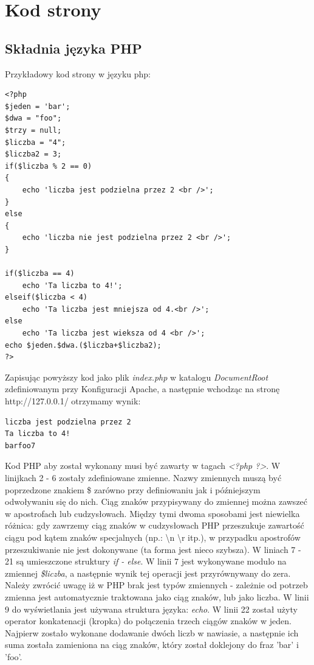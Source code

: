 \documentclass[a4paper,10pt]{article}
\begin{document}
\section{Kod strony}
\subsection{Składnia języka PHP}
Przykładowy kod strony w języku php: \\
\begin{verbatim}
<?php
$jeden = 'bar';
$dwa = "foo";
$trzy = null;
$liczba = "4";
$liczba2 = 3;
if($liczba % 2 == 0)
{
	echo 'liczba jest podzielna przez 2 <br />';
}
else
{
	echo 'liczba nie jest podzielna przez 2 <br />';
}

if($liczba == 4)
	echo 'Ta liczba to 4!';
elseif($liczba < 4)
	echo 'Ta liczba jest mniejsza od 4.<br />';
else
	echo 'Ta liczba jest wieksza od 4 <br />';
echo $jeden.$dwa.($liczba+$liczba2);
?>
\end{verbatim}
Zapisując powyższy kod jako plik \textit{index.php} w katalogu \textit{DocumentRoot} zdefiniowanym przy Konfiguracji Apache, a następnie wchodząc na stronę http://127.0.0.1/ otrzymamy wynik:
\begin{verbatim}
liczba jest podzielna przez 2
Ta liczba to 4!
barfoo7
\end{verbatim}
Kod PHP aby został wykonany musi być zawarty w tagach \textit{<?php ?>}.
W linijkach 2 - 6 zostały zdefiniowane zmienne. Nazwy zmiennych muszą być poprzedzone znakiem \$ zarówno przy definiowaniu jak i późniejszym odwoływaniu się do nich. Ciąg znaków przypisywany do zmiennej można zawszeć w apostrofach lub cudzysłowach. Między tymi dwoma sposobami jest niewielka różnica: gdy zawrzemy ciąg znaków w cudzysłowach PHP przeszukuje zawartość ciągu pod kątem znaków specjalnych (np.: \textbackslash n \textbackslash r itp.), w przypadku apostrofów przeszukiwanie nie jest dokonywane (ta forma jest nieco szybsza). W liniach 7 - 21 są umieszczone struktury \textit{if - else}. W linii 7 jest wykonywane modulo na zmiennej \textit{\$liczba}, a następnie wynik tej operacji jest przyrównywany do zera. Należy zwrócić uwagę iż w PHP brak jest typów zmiennych - zależnie od potrzeb zmienna jest automatycznie traktowana jako ciąg znaków, lub jako liczba. W linii 9 do wyświetlania jest używana struktura języka: \textit{echo}. W linii 22 został użyty operator konkatenacji (kropka) do połączenia trzech ciągów znaków w jeden. Najpierw zostało wykonane dodawanie dwóch liczb w nawiasie, a następnie ich suma została zamieniona na ciąg znaków, który został doklejony do fraz 'bar' i 'foo'. \\
\end{document}
